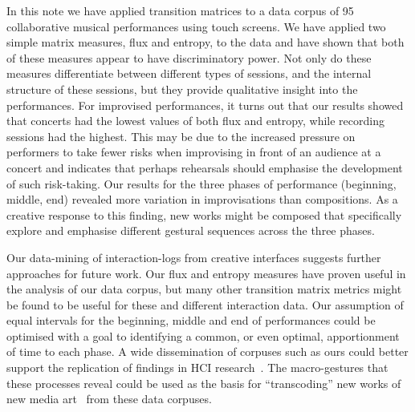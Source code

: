 \documentclass{sigchi}
\begin{document}
In this note we have applied transition matrices
to a data corpus of 95 collaborative musical performances using touch screens.
We have applied two simple matrix
measures, flux and entropy, to the data and have shown that
 both of these measures appear to 
have discriminatory power. Not only do these measures
differentiate between different types of sessions, and the internal
structure of these sessions, but they provide qualitative insight into the
performances. For improvised performances, it turns out that our results showed that concerts
had the lowest values of both flux and entropy, while recording sessions had
the highest. This may be due to the increased pressure on performers to take fewer risks
when improvising in front of an audience at a concert and indicates that perhaps rehearsals should 
emphasise the development of such risk-taking. 
Our results for the three phases of performance (beginning, middle, end)
revealed more variation in
improvisations than compositions. As a creative
 response to this finding, 
new works might be
composed that specifically explore and emphasise different gestural sequences across the three phases.

Our data-mining of interaction-logs from creative interfaces suggests
further approaches for future work.
Our flux and entropy measures have proven useful
in the analysis of our data corpus, but many other transition matrix
metrics might be found to be useful for these and different interaction data.
Our assumption of equal intervals for the beginning, middle and end of performances could be 
optimised with a goal to identifying a common, or even optimal, apportionment of time to each phase.  
A wide dissemination of corpuses such as ours could better support the replication of findings in HCI
research~\cite{Wilson:2011ve}. The macro-gestures that these
processes reveal could be used as the basis for ``transcoding'' new works of new media
art~\cite{Manovich:2002ly} from these data corpuses. 



\pagebreak


\end{document}
